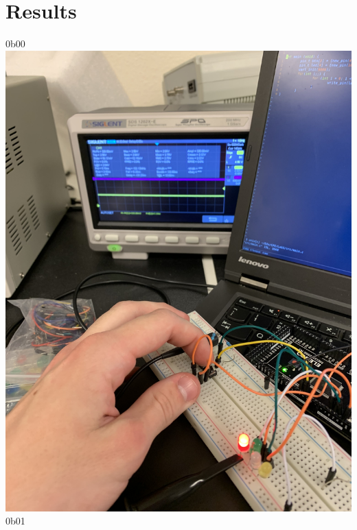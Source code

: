 \documentclass[]{article}
\begin{document}
\section{Results}
\begin{center}
	0b00\\
	\includegraphics[angle=-90,scale=.1]{0.jpg}\\
	\pagebreak
	0b01\\

\end{center}
\end{document}

